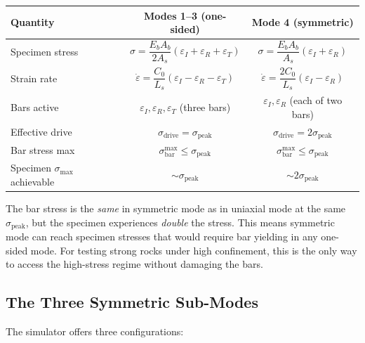 \documentclass[11pt,a4paper]{article}
\newcommand{\sig}{\sigma}
\newcommand{\eps}{\varepsilon}
\newcommand{\epsdot}{\dot\eps}
\newcommand{\Cz}{C_0}
\newcommand{\Ab}{A_b}
\newcommand{\As}{A_s}
\newcommand{\Ls}{L_s}
\newcommand{\sigpeak}{\sig_{\text{peak}}}
\begin{document}
\begin{center}
\renewcommand{\arraystretch}{1.4}
\begin{tabular}{@{}lcc@{}}
\toprule
\textbf{Quantity} & \textbf{Modes 1--3 (one-sided)} & \textbf{Mode 4 (symmetric)} \\
\midrule
Specimen stress & $\sig = \dfrac{E_b\Ab}{2\As}(\eps_I + \eps_R + \eps_T)$
                & $\sig = \dfrac{E_b\Ab}{\As}(\eps_I + \eps_R)$ \\
Strain rate     & $\epsdot = \dfrac{\Cz}{\Ls}(\eps_I - \eps_R - \eps_T)$
                & $\epsdot = \dfrac{2\Cz}{\Ls}(\eps_I - \eps_R)$ \\
Bars active     & $\eps_I, \eps_R, \eps_T$ (three bars) & $\eps_I, \eps_R$ (each of two bars) \\
Effective drive & $\sig_{\text{drive}} = \sigpeak$ & $\sig_{\text{drive}} = 2\sigpeak$ \\
Bar stress max  & $\sig_{\text{bar}}^{\max} \leq \sigpeak$
                & $\sig_{\text{bar}}^{\max} \leq \sigpeak$ \\
Specimen $\sig_{\max}$ achievable & $\sim \sigpeak$ & $\sim 2\sigpeak$ \\
\bottomrule
\end{tabular}
\end{center}

\begin{warningbox}
The bar stress is the \emph{same} in symmetric mode as in uniaxial mode at the
same $\sigpeak$, but the specimen experiences \emph{double} the stress. This
means symmetric mode can reach specimen stresses that would require bar yielding
in any one-sided mode. For testing strong rocks under high confinement, this is
the only way to access the high-stress regime without damaging the bars.
\end{warningbox}

\subsection{The Three Symmetric Sub-Modes}

The simulator offers three configurations:
\end{document}
